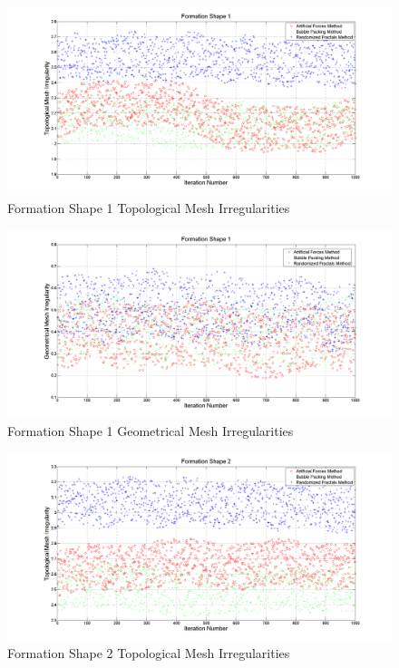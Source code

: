 \begin{figure}[H]
\caption{Formation Shape 1 Topological Mesh Irregularities} \label{topologic_ref_1}
\centerline{\includegraphics[scale = 0.35]{Topological_Irr_1}}
\end{figure} 	
		
\begin{figure}[H]
\caption{Formation Shape 1 Geometrical Mesh Irregularities} \label{geometric_ref_1}
\centerline{\includegraphics[scale = 0.35]{Geometrical_Irr_1}}
\end{figure} 	

\begin{figure}[H]
\caption{Formation Shape 2 Topological Mesh Irregularities} \label{topologic_ref_2}
\centerline{\includegraphics[scale = 0.35]{Topological_Irr_2}}
\end{figure} 	
				
